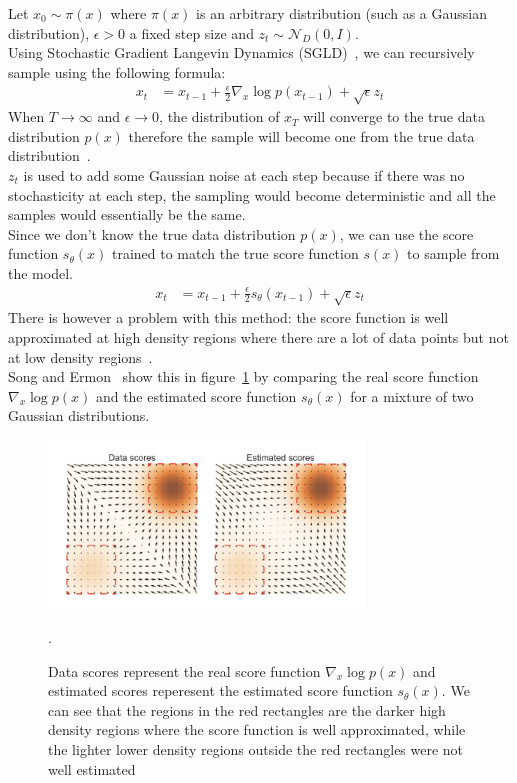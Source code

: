 \documentclass[twoside]{article}
\numberwithin{equation}{section}
\numberwithin{figure}{section}
\begin{document}
Let $x_0 \sim \pi (x)$ where $\pi (x)$ is an arbitrary distribution (such as a Gaussian distribution), $\epsilon > 0$ a fixed step size and $z_t \sim \mathcal{N}_D (0, I)$. \\
Using Stochastic Gradient Langevin Dynamics (SGLD)~\cite{song2020generative, WelTeh2011a}, we can recursively sample using the following formula:
\begin{align}
  x_t &= x_{t-1} + \frac{\epsilon}{2} \nabla_x \log p(x_{t-1}) + \sqrt{\epsilon} z_t
\end{align}
When $T \rightarrow \infty$ and $\epsilon \rightarrow 0$, the distribution of $x_T$ will converge to the true data distribution $p(x)$ therefore the sample will become one from the true data distribution~\cite{song2020generative,WelTeh2011a}. \\
$z_t$ is used to add some Gaussian noise at each step because if there was no stochasticity at each step, the sampling would become deterministic and all the samples would essentially be the same.\\
Since we don't know the true data distribution $p(x)$, we can use the score function $s_\theta (x)$ trained to match the true score function $s(x)$ to sample from the model. \\
\begin{align}
  x_t &= x_{t-1} + \frac{\epsilon}{2} s_\theta (x_{t-1}) + \sqrt{\epsilon} z_t
\end{align}
There is however a problem with this method: the score function is well approximated at high density regions where there are a lot of data points but not at low density regions~\cite{song2020generative}. \\
Song and Ermon~\cite{song2020generative} show this in figure~\ref{fig:scores} by comparing the real score function $\nabla_x \log p(x)$ and the estimated score function $s_\theta (x)$ for a mixture of two Gaussian distributions.
\begin{figure}[h]
  \begin{center}
    \includegraphics[width= 0.75\textwidth]{images/highlowdensity.png}
    \caption{Data scores represent the real score function $\nabla_x \log p(x)$ and estimated scores reperesent the estimated score function $s_\theta (x)$. We can see that the regions in the red rectangles are the darker high density regions where the score function is well approximated, while the lighter lower density regions outside the red rectangles were not well estimated~\cite{song2020generative}}.\label{fig:scores}
  \end{center}
\end{figure}
\end{document}
